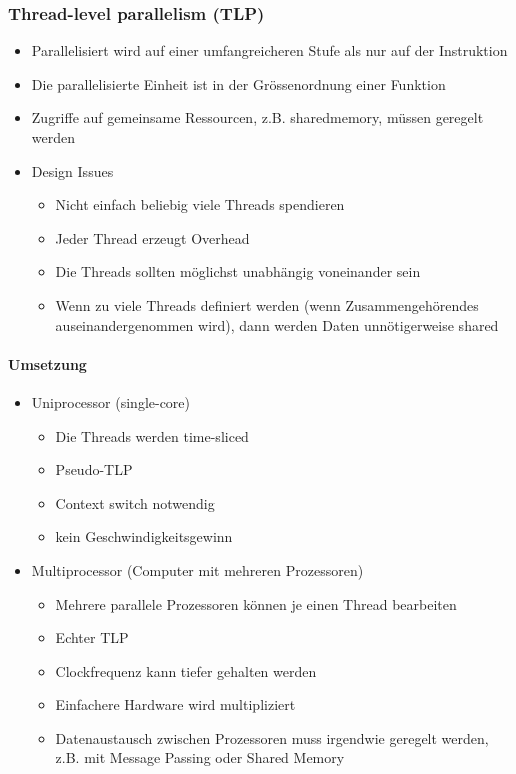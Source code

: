 \begin{multicols}{2}
\subsubsection{Thread-level parallelism (TLP)}
\begin{itemize}
	\item Parallelisiert wird auf einer umfangreicheren Stufe als nur auf der Instruktion
	\item Die parallelisierte Einheit ist in der Grössenordnung einer Funktion
	\item Zugriffe auf gemeinsame Ressourcen, z.B. sharedmemory, müssen geregelt werden
	\item Design Issues
	\begin{itemize}
		\item Nicht einfach beliebig viele Threads spendieren
		\item Jeder Thread erzeugt Overhead
		\item Die Threads sollten möglichst unabhängig voneinander sein
		\item Wenn zu viele Threads definiert werden (wenn Zusammengehörendes auseinandergenommen wird), dann werden Daten unnötigerweise shared
	\end{itemize}
\end{itemize}
\columnbreak
\paragraph{Umsetzung}
\begin{itemize}
	\item Uniprocessor (single-core)
	\begin{itemize}
		\item Die Threads werden time-sliced
		\item Pseudo-TLP
		\item Context switch notwendig
		\item kein Geschwindigkeitsgewinn
	\end{itemize}
	\item  Multiprocessor (Computer mit mehreren Prozessoren)
	\begin{itemize}
		\item Mehrere parallele Prozessoren können je einen Thread bearbeiten
		\item Echter TLP
		\item Clockfrequenz kann tiefer gehalten werden
		\item Einfachere Hardware wird multipliziert
		\item Datenaustausch zwischen Prozessoren muss irgendwie geregelt werden, z.B. mit Message Passing oder Shared Memory
	\end{itemize}
\end{itemize}
\end{multicols}
\newpage


